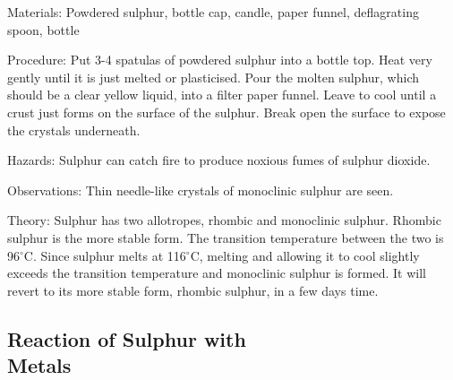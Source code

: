 \begin{multicols}{2}
\begin{description*}
\item[Materials:]{Powdered sulphur, bottle cap, candle, paper funnel, deflagrating spoon, bottle}
\item[Procedure:]{Put 3-4 spatulas of powdered sulphur into a
bottle top. Heat very
gently until it is just melted or plasticised. Pour the
molten sulphur, which should be a clear yellow
liquid, into a filter paper funnel. Leave
to cool until a crust just forms on the
surface of the sulphur. Break open the surface to
expose the crystals underneath.}
\item[Hazards:]{Sulphur can catch fire to produce noxious
fumes of sulphur dioxide.}
\item[Observations:]{Thin needle-like crystals of monoclinic
sulphur are seen.}
\item[Theory:]{Sulphur has two allotropes, rhombic and
monoclinic sulphur. Rhombic sulphur is the
more stable form. The transition temperature
between the two is 96$^\circ$C. Since sulphur
melts at 116$^\circ$C, melting and
allowing it to cool slightly exceeds the transition
temperature and monoclinic sulphur
is formed. It will revert to its
more stable form, rhombic sulphur, in a few
days time.}
\end{description*}

\subsection[Reaction of Sulphur with Metals]{Reaction of Sulphur with \hfill \\ Metals} %



\end{multicols}

